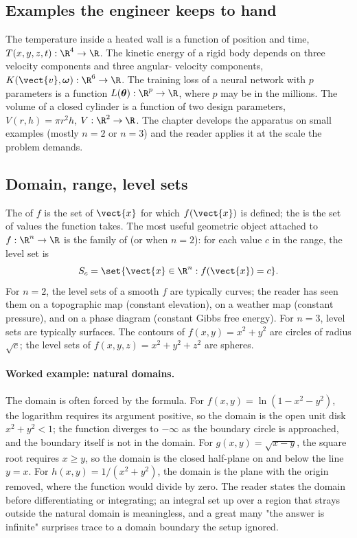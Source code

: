 \subsection{Examples the engineer keeps to hand}

The temperature inside a heated wall is a function of position
and time, $T(x, y, z, t) : \R^{4} \to \R$. The kinetic energy of a
rigid body depends on three velocity components and three angular-
velocity components, $K(\vect{v}, \boldsymbol{\omega}) : \R^{6} \to
\R$. The training loss of a neural network with $p$ parameters is a
function $L(\boldsymbol{\theta}) : \R^{p} \to \R$, where $p$ may be
in the millions. The volume of a closed cylinder is a function of
two design parameters, $V(r, h) = \pi r^{2} h$, $V : \R^{2} \to \R$.
The chapter develops the apparatus on small examples (mostly
$n = 2$ or $n = 3$) and the reader applies it at the scale the
problem demands.

\subsection{Domain, range, level sets}

The  of $f$ is the set of $\vect{x}$ for which
$f(\vect{x})$ is defined; the  is the set of values
the function takes. The most useful geometric object attached to
$f : \R^{n} \to \R$ is the family of  (or
 when $n = 2$): for each value $c$ in the range,
the level set is
\[
S_{c} = \set{\vect{x} \in \R^{n} : f(\vect{x}) = c}.
\]
For $n = 2$, the level sets of a smooth $f$ are typically curves;
the reader has seen them on a topographic map (constant elevation),
on a weather map (constant pressure), and on a phase diagram
(constant Gibbs free energy). For $n = 3$, level sets are typically
surfaces. The contours of $f(x, y) = x^{2} + y^{2}$ are circles of
radius $\sqrt{c}$; the level sets of $f(x, y, z) = x^{2} + y^{2} +
z^{2}$ are spheres.

\paragraph{Worked example: natural domains.} The domain is often
forced by the formula. For $f(x, y) = \ln(1 - x^{2} - y^{2})$, the
logarithm requires its argument positive, so the domain is the open
unit disk $x^{2} + y^{2} < 1$; the function diverges to $-\infty$ as
the boundary circle is approached, and the boundary itself is not in
the domain. For $g(x, y) = \sqrt{x - y}$, the square root requires
$x \geq y$, so the domain is the closed half-plane on and below the
line $y = x$. For $h(x, y) = 1/(x^{2} + y^{2})$, the domain is the
plane with the origin removed, where the function would divide by
zero. The reader states the domain before differentiating or
integrating; an integral set up over a region that strays outside
the natural domain is meaningless, and a great many "the answer is
infinite" surprises trace to a domain boundary the setup ignored.

